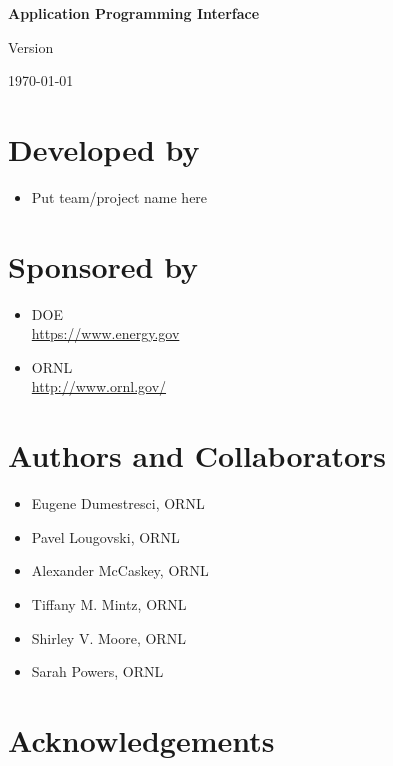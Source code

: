 \thispagestyle{empty}
\begin{center}
\textbf{\Huge \qcor}
\par
\end{center}
\begin{center}
\textbf{\LARGE Application Programming Interface}\\
\par
\end{center}

\begin{center}
Version \insertDocVersion
\par
\end{center}

\vspace{0.5in}
\begin{center}
\today
\end{center}

\vspace{0.5in}

\vfill{}

\section*{Developed by}
\begin{itemize}
\item Put team/project name here\\
\end{itemize}
\pagebreak{}

\section*{Sponsored by}
\begin{itemize}
\item \ac{DOE}\\
  \url{https://www.energy.gov}
\item \ac{ORNL}\\
  \url{http://www.ornl.gov/} 
\end{itemize}

\section*{Authors and Collaborators}
\begin{itemize}
\item Eugene Dumestresci, \ac{ORNL}
\item Pavel Lougovski, \ac{ORNL}
\item Alexander McCaskey, \ac{ORNL}
\item Tiffany M. Mintz, \ac{ORNL}
\item Shirley V. Moore, \ac{ORNL}
\item Sarah Powers, \ac{ORNL}
\end{itemize}

\date{\today}

\section*{Acknowledgements}



